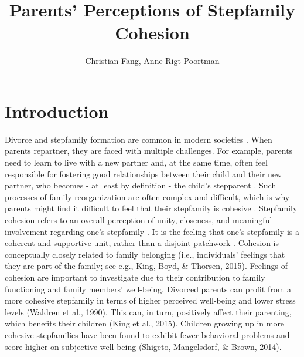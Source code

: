 \documentclass[\pandocDocMode,longtable,floatsintext]{apa6}
\title{Parents' Perceptions of Stepfamily Cohesion}
\author{Christian Fang, Anne-Rigt Poortman}
\affiliation{Utrecht University}
\begin{document}
\maketitle

\hypertarget{introduction}{%
\section{Introduction}\label{introduction}}

Divorce and stepfamily formation are common in modern societies
\autocite{raley_divorce_2020}. When parents repartner, they are faced
with multiple challenges. For example, parents need to learn to live
with a new partner and, at the same time, often feel responsible for
fostering good relationships between their child and their new partner,
who becomes - at least by definition - the child's stepparent
\autocite{jensen2017transitioning}. Such processes of family
reorganization are often complex and difficult, which is why parents
might find it difficult to feel that their stepfamily is cohesive
\autocite[ \textcite{pink1985problem}
\textcite{waldren1990cohesion}]{ganong2019stepfathers}. Stepfamily
cohesion refers to an overall perception of unity, closeness, and
meaningful involvement regarding one's stepfamily \autocite[
\textcite{waldren1990cohesion}
\textcite{jensen2022associations}]{komter2006strength}. It is the
feeling that one's stepfamily is a coherent and supportive unit, rather
than a disjoint patchwork \autocite{favez2015coparenting}. Cohesion is
conceptually closely related to family belonging (i.e., individuals'
feelings that they are part of the family; see e.g., King, Boyd, \&
Thorsen, 2015). Feelings of cohesion are important to investigate due to
their contribution to family functioning and family members' well-being.
Divorced parents can profit from a more cohesive stepfamily in terms of
higher perceived well-being and lower stress levels (Waldren et al.,
1990). This can, in turn, positively affect their parenting, which
benefits their children (King et al., 2015). Children growing up in more
cohesive stepfamilies have been found to exhibit fewer behavioral
problems and score higher on subjective well-being (Shigeto,
Mangelsdorf, \& Brown, 2014).
\end{document}
